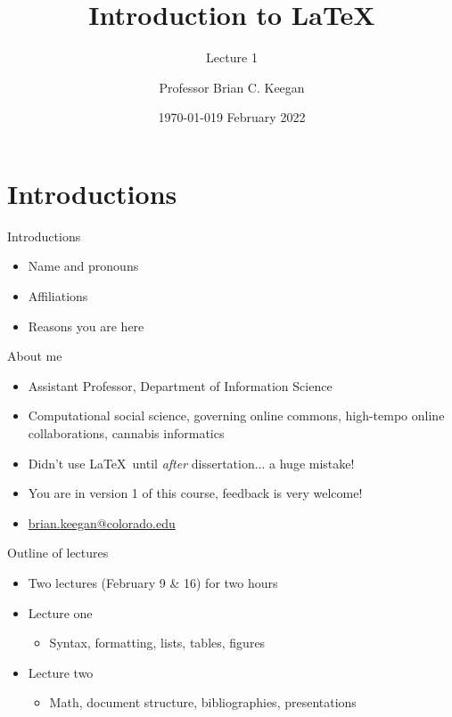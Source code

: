 \documentclass{cubeamer}
\title{Introduction to \LaTeX}
\subtitle{%
Lecture 1
}
\author[Brian Keegan]{Professor Brian C. Keegan}
\date{\today} %
\institute[Inofrmation Science]{Department of Information Science}
\date{9 February 2022}
\begin{document}
\maketitle


\section{Introductions}


\begin{frame}{Introductions}
    \begin{itemize}
        \item Name and pronouns
        \item Affiliations
        \item Reasons you are here
    \end{itemize}
\end{frame}

\begin{frame}{About me}
    \begin{itemize}
        \item Assistant Professor, Department of Information Science
        \item Computational social science, governing online commons, high-tempo online collaborations, cannabis informatics
        \item Didn't use \LaTeX~until \textit{after} dissertation... a huge mistake!
        \item You are in version 1 of this course, feedback is very welcome!
        \item \href{mailto:brian.keegan@colorado.edu}{brian.keegan@colorado.edu}
    \end{itemize}
\end{frame}


\begin{frame}{Outline of lectures}
    \begin{itemize}
        \item Two lectures (February 9 \& 16) for two hours
        \item Lecture one
        \begin{itemize}
            \item Syntax, formatting, lists, tables, figures
        \end{itemize}
        \item Lecture two
        \begin{itemize}
            \item Math, document structure, bibliographies, presentations
        \end{itemize}
    \end{itemize}
\end{frame}
\end{document}
